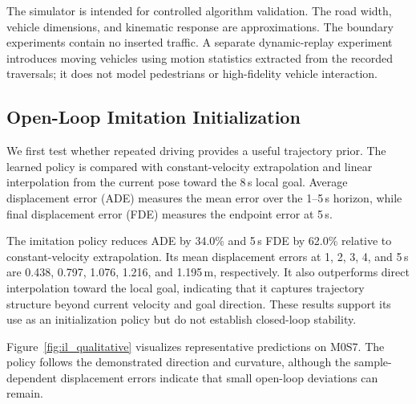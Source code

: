 The simulator is intended for controlled algorithm validation. The road width, vehicle dimensions, and kinematic response are approximations. The boundary experiments contain no inserted traffic. A separate dynamic-replay experiment introduces moving vehicles using motion statistics extracted from the recorded traversals; it does not model pedestrians or high-fidelity vehicle interaction.

\subsection{Open-Loop Imitation Initialization}
\label{sec:open_loop_il}

We first test whether repeated driving provides a useful trajectory prior. The learned policy is compared with constant-velocity extrapolation and linear interpolation from the current pose toward the 8\,s local goal. Average displacement error (ADE) measures the mean error over the 1--5\,s horizon, while final displacement error (FDE) measures the endpoint error at 5\,s.

\begin{table}[t]
\centering
\caption{Open-loop trajectory prediction on 304 held-out M0S7 samples.}
\label{tab:il_trajectory_prediction}
\end{table}

The imitation policy reduces ADE by 34.0\% and 5\,s FDE by 62.0\% relative to constant-velocity extrapolation. Its mean displacement errors at 1, 2, 3, 4, and 5\,s are 0.438, 0.797, 1.076, 1.216, and 1.195\,m, respectively. It also outperforms direct interpolation toward the local goal, indicating that it captures trajectory structure beyond current velocity and goal direction. These results support its use as an initialization policy but do not establish closed-loop stability.

Figure~\ref{fig:il_qualitative} visualizes representative predictions on M0S7. The policy follows the demonstrated direction and curvature, although the sample-dependent displacement errors indicate that small open-loop deviations can remain.

